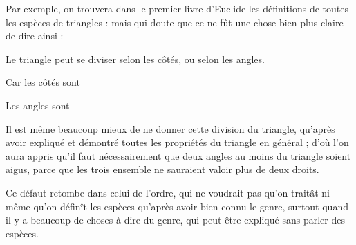 Par exemple, on trouvera dans le premier livre d'Euclide les définitions de toutes les espèces de triangles : mais qui doute que ce ne fût une chose bien plus claire de dire ainsi :

Le triangle peut se diviser selon les côtés, ou selon les angles.

Car les côtés sont
\begin{center}
\end{center}

Les angles sont

\begin{center}
\end{center}

\begin{center}
\end{center}


Il est même beaucoup mieux de ne donner cette division du triangle, qu'après avoir expliqué et démontré toutes les propriétés du triangle en général ; d'où l'on aura appris qu'il faut nécessairement que deux angles au moins du triangle soient aigus, parce que les trois ensemble ne sauraient valoir plus de deux droits.

Ce défaut retombe dans celui de l'ordre, qui ne voudrait pas qu'on traitât ni même qu'on définît les espèces qu'après avoir bien connu le genre, surtout quand il y a beaucoup de choses à dire du genre, qui peut être expliqué sans parler des espèces.

